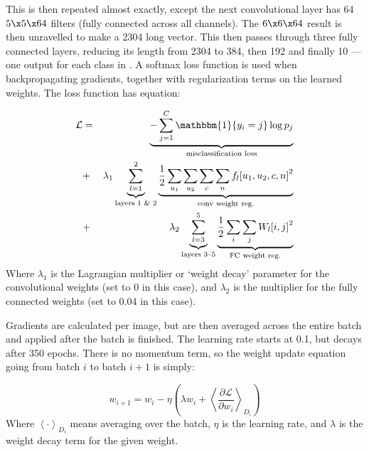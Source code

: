   This is then repeated almost exactly, except the next convolutional layer has
  64 $5\x 5\x 64$ filters (fully connected across all channels). The $6 \x 6 \x
  64$ result is then unravelled to make a 2304 long vector. This then passes
  through three fully connected layers, reducing its length from 2304 to 384,
  then 192 and finally 10 --- one output for each class in \cifar. A softmax
  loss function is used when backpropagating gradients, together with
  regularization terms on the learned weights. The loss function has
  equation:

  \begin{eqnarray*}
    \mathcal{L} &=& %
      \underbrace{-\sum_{j=1}^{C}
        \mathbbm{1}\{y_i=j\} \log p_j}_{\text{misclassification loss}} \\
     &+& \lambda_{1} \underbrace{\sum_{l=1}^{2}}_{\text{layers 1 \& 2}} 
        \underbrace{\frac{1}{2}\sum_{u_1} \sum_{u_2} \sum_{c} \sum_{n}
          {f_l[u_1,u_2,c,n]}^2}_{\text{conv weight reg.}} \\
     &+& \lambda_{2} \underbrace{\sum_{l=3}^{5}}_{ {\text{layers 3--5}}}
        \underbrace{\frac{1}{2} \sum_{i} \sum_{j}  {W_l[i,j]}^2}_{%
          \text{FC weight reg.}}  
  \end{eqnarray*}
  Where $\lambda_1$ is the Lagrangian multiplier or `weight decay' parameter  
  for the convolutional weights (set to $0$ in this case), and $\lambda_2$ 
  is the multiplier for the fully connected weights (set to $0.04$ in this
  case). 

  Gradients are calculated per image, but are then averaged across the entire
  batch and applied after the batch is finished. The learning rate starts at
  0.1, but decays after 350 epochs. There is no momentum term, so the weight
  update equation going from batch $i$ to batch $i+1$ is simply:

  \begin{equation}
    w_{i+1} = w_{i} - \eta \left(\lambda w_i + \left<\frac{\partial\mathcal{L}}{\partial w_i}
    \right>_{D_i} \right)
  \end{equation}
  Where $\left< \cdot \right>_{D_i}$ means averaging over the batch, $\eta$ is
  the learning rate, and $\lambda$ is the weight decay term for the given
  weight.

